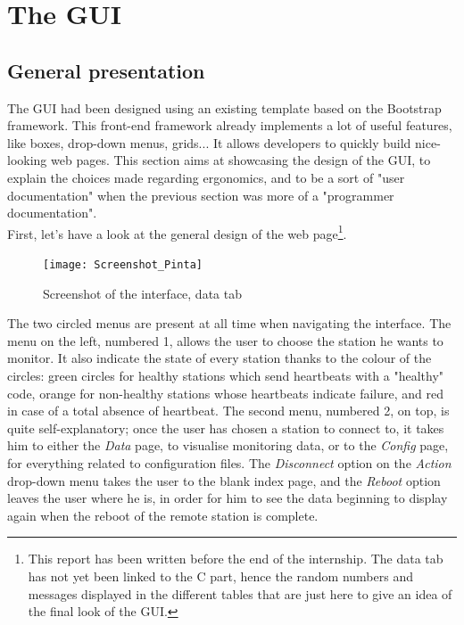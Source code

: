 \documentclass{themeensg}
\begin{document}
\clearpage
\section{The GUI}

\subsection{General presentation}
The GUI had been designed using an existing template based on the Bootstrap framework. This front-end framework already implements a lot of useful features, like boxes, drop-down menus, grids... It allows developers to quickly build nice-looking web pages. This section aims at showcasing the design of the GUI, to explain the choices made regarding ergonomics, and to be a sort of "user documentation" when the previous section was more of a "programmer documentation".\\

First, let's have a look at the general design of the web page\footnote{This report has been written before the end of the internship. The data tab has not yet been linked to the C part, hence the random numbers and messages displayed in the different tables that are just here to give an idea of the final look of the GUI.}.\\

\begin{figure}[ht]
	\centering
	\texttt{[image: Screenshot\_Pinta]}
	\caption{Screenshot of the interface, data tab}
\end{figure}

The two circled menus are present at all time when navigating the interface. The menu on the left, numbered 1, allows the user to choose the station he wants to monitor. It also indicate the state of every station thanks to the colour of the circles: green circles for healthy stations which send heartbeats with a "healthy" code, orange for non-healthy  stations whose heartbeats indicate failure, and red in case of a total absence of heartbeat.
The second menu, numbered 2, on top, is quite self-explanatory; once the user has chosen a station to connect to, it takes him to either the \textit{Data} page, to visualise monitoring data, or to the \textit{Config} page, for everything related to configuration files. The \textit{Disconnect} option on the \textit{Action} drop-down menu takes the user to the blank index page, and the \textit{Reboot} option leaves the user where he is, in order for him to see the data beginning to display again when the reboot of the remote station is complete.\\
\end{document}
